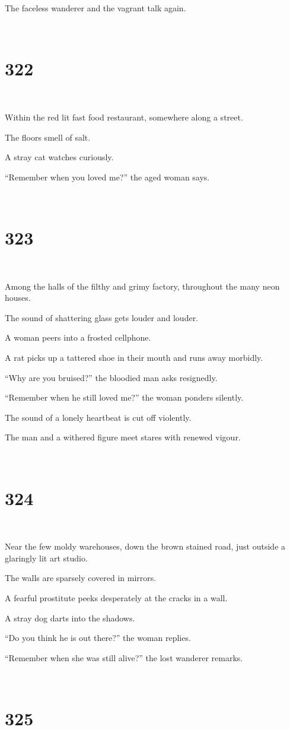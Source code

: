 \documentclass{report}
\begin{document}
The faceless wanderer and the vagrant talk again.

~
\chapter*{322}
~

Within the red lit fast food restaurant, somewhere along a street.

The floors smell of salt.

A stray cat watches curiously.

``Remember when you loved me?'' the aged woman says.

~
\chapter*{323}
~

Among the halls of the filthy and grimy factory, throughout the many neon houses.

The sound of shattering glass gets louder and louder.

A woman peers into a frosted cellphone.

A rat picks up a tattered shoe in their mouth and runs away morbidly.

``Why are you bruised?'' the bloodied man asks resignedly.

``Remember when he still loved me?'' the woman ponders silently.

The sound of a lonely heartbeat is cut off violently.

The man and a withered figure meet stares with renewed vigour.

~
\chapter*{324}
~

Near the few moldy warehouses, down the brown stained road, just outside a glaringly lit art studio.

The walls are sparsely covered in mirrors.

A fearful prostitute peeks desperately at the cracks in a wall.

A stray dog darts into the shadows.

``Do you think he is out there?'' the woman replies.

``Remember when she was still alive?'' the lost wanderer remarks.

~
\chapter*{325}
~
\end{document}
